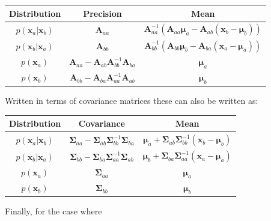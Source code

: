 \documentclass[a4paper, 11pt]{article}
\begin{document}
\begin{table}[H]
\centering
\begin{tabular}{c|c|c}
  Distribution & Precision & Mean \\
  \hline
  $p(\boldsymbol{x}_a|\boldsymbol{x}_b)$ & $\boldsymbol{A}_{aa}$  & $\boldsymbol{A}^{-1}_{aa} \left( \boldsymbol{A}_{aa} \boldsymbol{\mu}_a - \boldsymbol{A}_{ab}(\boldsymbol{x}_b-\boldsymbol{\mu}_b) \right)$ \\

  $p(\boldsymbol{x}_b|\boldsymbol{x}_a)$ & $\boldsymbol{A}_{bb}$ & $\boldsymbol{A}_{bb}^{-1} \left( \boldsymbol{A}_{bb}\boldsymbol{\mu}_b - \boldsymbol{A}_{ba}(\boldsymbol{x}_a-\boldsymbol{\mu}_a) \right)$ \\

  $p(\boldsymbol{x}_a)$ & $\boldsymbol{A}_{aa} - \boldsymbol{A}_{ab}\boldsymbol{A}_{bb}^{-1} \boldsymbol{A}_{ba}$ & $\boldsymbol{\mu}_a$  \\

  $p(\boldsymbol{x}_b)$ & $\boldsymbol{A}_{bb} - \boldsymbol{A}_{ba}\boldsymbol{A}_{aa}^{-1} \boldsymbol{A}_{ab}$ & $\boldsymbol{\mu}_b$  \\
\end{tabular}
\end{table}
Written in terms of covariance matrices these can also be written as:

\begin{table}[H]
\centering
\begin{tabular}{c|c|c}
  Distribution & Covariance & Mean \\
  \hline
  $p(\boldsymbol{x}_a|\boldsymbol{x}_b)$ & $\boldsymbol{\Sigma}_{aa} - \boldsymbol{\Sigma}_{ab}\boldsymbol{\Sigma}_{bb}^{-1}\boldsymbol{\Sigma}_{ba}$ & $\boldsymbol{\mu}_a + \boldsymbol{\Sigma}_{ab} \boldsymbol{\Sigma}_{bb}^{-1} (\boldsymbol{x}_b-\boldsymbol{\mu}_b)$ \\

  $p(\boldsymbol{x}_b|\boldsymbol{x}_a)$ & $\boldsymbol{\Sigma}_{bb} - \boldsymbol{\Sigma}_{ba}\boldsymbol{\Sigma}_{aa}^{-1}\boldsymbol{\Sigma}_{ab}$ & $\boldsymbol{\mu}_b + \boldsymbol{\Sigma}_{ba} \boldsymbol{\Sigma}_{aa}^{-1} (\boldsymbol{x}_a-\boldsymbol{\mu}_a)$ \\

  $p(\boldsymbol{x}_a)$ & $\boldsymbol{\Sigma}_{aa}$ & $\boldsymbol{\mu}_a$  \\
  $p(\boldsymbol{x}_b)$ & $\boldsymbol{\Sigma}_{bb}$ & $\boldsymbol{\mu}_b$  \\
\end{tabular}
\end{table}
Finally, for the case where
\end{document}
